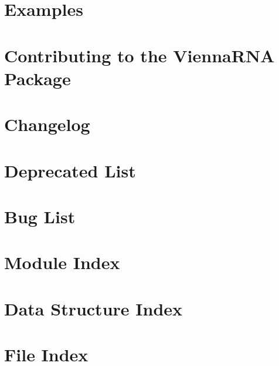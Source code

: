 \let\mypdfximage\pdfximage\def\pdfximage{\immediate\mypdfximage}\documentclass[twoside]{book}
\newcommand{\+}{\discretionary{\mbox{\scriptsize$\hookleftarrow$}}{}{}}
\begin{document}
\chapter{Examples}
\label{examples}

\chapter{Contributing to the Vienna\+RNA Package}
\label{md_CONTRIBUTING}

\chapter{Changelog}
\label{md_CHANGELOG}

\chapter{Deprecated List}
\label{deprecated}

\chapter{Bug List}
\label{bug}

\chapter{Module Index}

\chapter{Data Structure Index}

\chapter{File Index}

\end{document}
